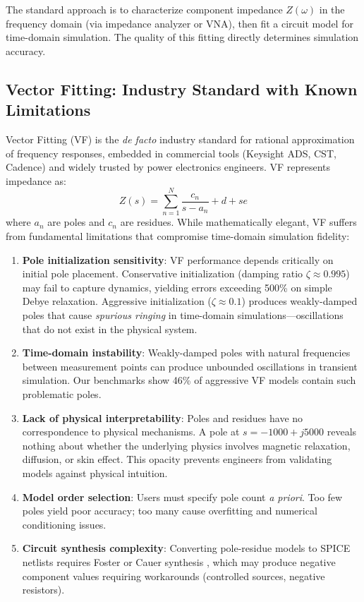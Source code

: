 \documentclass{ieeeaccess}
\begin{document}
The standard approach is to characterize component impedance $Z(\omega)$ in the frequency domain (via impedance analyzer or VNA), then fit a circuit model for time-domain simulation. The quality of this fitting directly determines simulation accuracy.

\subsection{Vector Fitting: Industry Standard with Known Limitations}

Vector Fitting (VF) \cite{gustavsen1999rational,gustavsen2006improving} is the \textit{de facto} industry standard for rational approximation of frequency responses, embedded in commercial tools (Keysight ADS, CST, Cadence) and widely trusted by power electronics engineers. VF represents impedance as:
\begin{equation}
Z(s) = \sum_{n=1}^{N} \frac{c_n}{s - a_n} + d + se
\label{eq:vf}
\end{equation}
where $a_n$ are poles and $c_n$ are residues. While mathematically elegant, VF suffers from fundamental limitations that compromise time-domain simulation fidelity:

\begin{enumerate}
\item \textbf{Pole initialization sensitivity}: VF performance depends critically on initial pole placement. Conservative initialization (damping ratio $\zeta \approx 0.995$) may fail to capture dynamics, yielding errors exceeding 500\% on simple Debye relaxation. Aggressive initialization ($\zeta \approx 0.1$) produces weakly-damped poles that cause \textit{spurious ringing} in time-domain simulations---oscillations that do not exist in the physical system.

\item \textbf{Time-domain instability}: Weakly-damped poles with natural frequencies between measurement points can produce unbounded oscillations in transient simulation. Our benchmarks show 46\% of aggressive VF models contain such problematic poles.

\item \textbf{Lack of physical interpretability}: Poles and residues have no correspondence to physical mechanisms. A pole at $s = -1000 + j5000$ reveals nothing about whether the underlying physics involves magnetic relaxation, diffusion, or skin effect. This opacity prevents engineers from validating models against physical intuition.

\item \textbf{Model order selection}: Users must specify pole count \textit{a priori}. Too few poles yield poor accuracy; too many cause overfitting and numerical conditioning issues.

\item \textbf{Circuit synthesis complexity}: Converting pole-residue models to SPICE netlists requires Foster or Cauer synthesis \cite{foster1924reactance,cauer1958synthesis}, which may produce negative component values requiring workarounds (controlled sources, negative resistors).
\end{enumerate}
\end{document}
